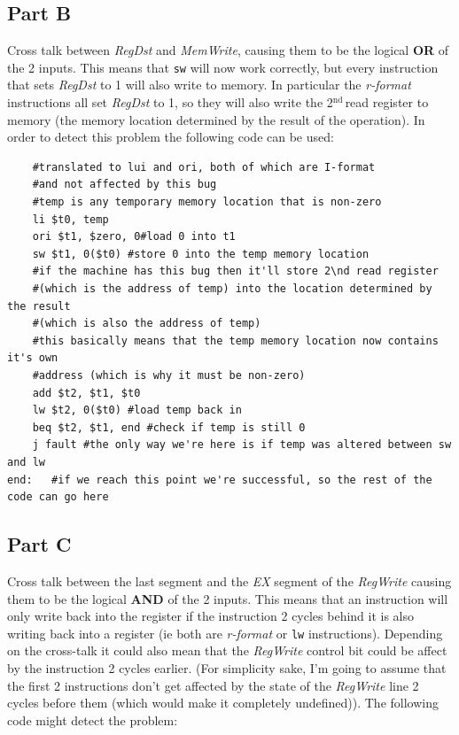 \documentclass[11pt]{article} %
\newcommand{\strong}[1]{\textbf{#1}}
\newcommand{\code}[1]{\texttt{#1}}
\newcommand{\nd}{$^{\text{nd}\ }$}
\begin{document}
\subsection{Part B}

Cross talk between \emph{RegDst} and \emph{MemWrite}, causing them to be the logical \strong{OR} of the 2 inputs. This means that \code{sw} will now work correctly, but every instruction that sets \emph{RegDst} to 1 will also write to memory. In particular the \emph{r-format} instructions all set \emph{RegDst} to 1, so they will also write the 2\nd read register to memory (the memory location determined by the result of the operation). In order to detect this problem the following code can be used:

\begin{verbatim}
    #translated to lui and ori, both of which are I-format 
    #and not affected by this bug
    #temp is any temporary memory location that is non-zero
    li $t0, temp 
    ori $t1, $zero, 0#load 0 into t1
    sw $t1, 0($t0) #store 0 into the temp memory location
    #if the machine has this bug then it'll store 2\nd read register 
    #(which is the address of temp) into the location determined by the result 
    #(which is also the address of temp)
    #this basically means that the temp memory location now contains it's own 
    #address (which is why it must be non-zero)
    add $t2, $t1, $t0 
    lw $t2, 0($t0) #load temp back in
    beq $t2, $t1, end #check if temp is still 0
    j fault #the only way we're here is if temp was altered between sw and lw
end:   #if we reach this point we're successful, so the rest of the code can go here
\end{verbatim}

\subsection{Part C}

Cross talk between the last segment and the \emph{EX} segment of the \emph{RegWrite} causing them to be the logical \strong{AND} of the 2 inputs. This means that an instruction will only write back into the register if the instruction 2 cycles behind it is also writing back into a register (ie both are \emph{r-format} or \code{lw} instructions). Depending on the cross-talk it could also mean that the \emph{RegWrite} control bit could be affect by the instruction 2 cycles earlier. (For simplicity sake, I'm going to assume that the first 2 instructions don't get affected by the state of the \emph{RegWrite} line 2 cycles before them (which would make it completely undefined)). The following code might detect the problem:
\end{document}
